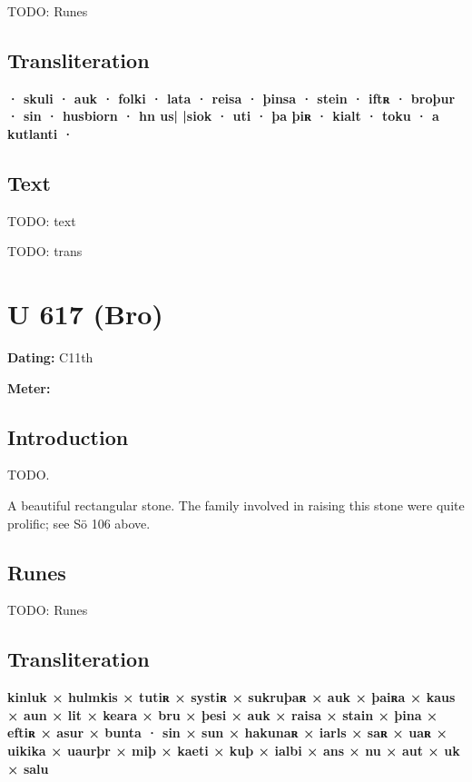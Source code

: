 TODO: Runes%

\subsection{Transliteration}

\textbf{· skuli · auk · folki · lata · reisa · þinsa · stein · iftʀ · broþur · sin · husbiorn · hn us| |siok · uti · þa þiʀ · kialt · toku · a kutlanti ·}

\subsection{Text}

\bpg\bpa[0]%
TODO: text\epa

\bpb TODO: trans\epb\epg

\sectionline\clearpage


\section{U 617 (Bro)}

\begin{flushright}%
\textbf{Dating:} C11th

\textbf{Meter:} \Fornyrdislag
\end{flushright}%

\subsection{Introduction}

TODO.

A beautiful rectangular stone.  The family involved in raising this stone were quite prolific; see Sö 106 above.

\subsection{Runes}

TODO: Runes%

\subsection{Transliteration}

\textbf{kinluk × hulmkis × tutiʀ × systiʀ × sukruþaʀ × auk × þaiʀa × kaus × aun × lit × keara × bru × þesi × auk × raisa × stain × þina × eftiʀ × asur × bunta · sin × sun × hakunaʀ × iarls × saʀ × uaʀ × uikika × uaurþr × miþ × kaeti × kuþ × ialbi × ans × nu × aut × uk × salu}

